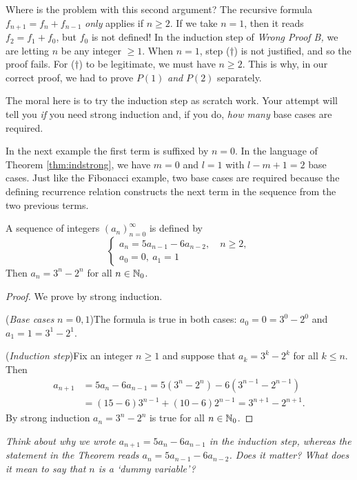 Where is the problem with this second argument? The recursive formula $f_{n+1}=f_n+f_{n-1}$ \emph{only} applies if $n\ge 2$. If we take $n=1$, then it reads $f_2=f_1+f_0$, but $f_0$ is not defined! In the induction step of \emph{Wrong Proof B,} we are letting $n$ be any integer $\ge 1$. When $n=1$, step ($\dag$) is not justified, and so the proof fails. For ($\dag$) to be legitimate, we must have $n\ge 2$. This is why, in our correct proof, we had to prove $P(1)$ \emph{and} $P(2)$ separately.\par

The moral here is to try the induction step as scratch work. Your attempt will tell you \emph{if} you need strong induction and, if you do, \emph{how many} base cases are required.



In the next example the first term is suffixed by $n=0$. In the language of Theorem \ref{thm:indstrong}, we have $m=0$ and $l=1$ with $l-m+1=2$ base cases. Just like the Fibonacci example, two base cases are required because the defining recurrence relation constructs the next term in the sequence from the two previous terms.

\begin{thm}{}{}
	A sequence of integers $(a_n)_{n=0}^\infty$ is defined by
	\[
		\begin{cases}
			a_n=5a_{n-1}-6a_{n-2},\quad n\ge 2,\\
			a_0=0,\ a_1=1
		\end{cases}
	\]
	Then $a_n=3^n-2^n$ for all $n\in\mathbb{N}_0$.
\end{thm}

\begin{proof}
	We prove by strong induction.\par
	(\emph{Base cases} $n=0,1$)\quad The formula is true in both cases: $a_0=0=3^0-2^0$ and $a_1=1=3^1-2^1$.\par
	(\emph{Induction step})\quad Fix an integer $n\ge 1$ and suppose that $a_k=3^k-2^k$ for all $k\le n$. Then
	\begin{align*}
		a_{n+1}&=5a_n-6a_{n-1}=5(3^n-2^n)-6(3^{n-1}-2^{n-1})\\
		&=(15-6)3^{n-1}+(10-6)2^{n-1}=3^{n+1}-2^{n+1}.
	\end{align*}
	By strong induction $a_n=3^n-2^n$ is true for all $n\in\mathbb{N}_0$.
\end{proof}

\emph{Think about why we wrote $a_{n+1}=5a_n-6a_{n-1}$ in the induction step, whereas the statement in the Theorem reads $a_n=5a_{n-1}-6a_{n-2}$. Does it matter? What does it mean to say that $n$ is a `dummy variable'?}\par

